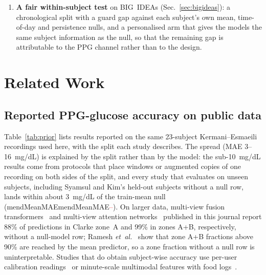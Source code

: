 \documentclass[journal]{IEEEtran}
\newcommand{\m}[1]{\ifcsname #1\endcsname\csname #1\endcsname\else\textcolor{red}{--}\fi}
\begin{document}
\begin{enumerate}
        pipeline for five re-implemented methods on VitalDB;
        \textsc{ppgbench} differs in asserting each protocol's no-leak
        guarantee in code, freezing folds, and adding subject-cluster
        intervals, controls, within-subject nulls and pretrained-encoder rows.
  \item \textbf{A fair within-subject test} on BIG~IDEAs
        (Sec.~\ref{sec:bigideas}): a chronological split with a guard gap
        against each subject's own mean, time-of-day and persistence nulls,
        and a personalised arm that gives the models the same subject
        information as the null, so that the remaining gap is attributable
        to the PPG channel rather than to the design.
\end{enumerate}

\section{Related Work}
\label{sec:related}

\subsection{Reported PPG-glucose accuracy on public data}
Table~\ref{tab:prior} lists results reported on the same 23-subject
Kermani--Esmaeili recordings used here, with the split each study describes.
The spread (MAE 3--16~mg/dL) is explained by the split rather than by the
model: the sub-10~mg/dL results come from protocols that place windows or
augmented copies of one recording on both sides of the split, and every
study that evaluates on unseen subjects, including Syamsul and Kim's
held-out subjects without a null row, lands within about 3~mg/dL of the
train-mean null (\m{mendMeanMAE}).  On larger data, multi-view fusion
transformers~\cite{chen2024mvcft} and multi-view attention
networks~\cite{ali2025jbhi} published in this journal report 88\% of
predictions in Clarke zone~A and 99\% in zones A+B, respectively, without a
null-model row; Ramesh \emph{et~al.}~\cite{ramesh2026} show that zone A+B
fractions above 90\% are reached by the mean predictor, so a zone fraction
without a null row is uninterpretable.  Studies that do obtain subject-wise accuracy use per-user
calibration readings~\cite{chu2021,chu2025} or minute-scale multimodal
features with food logs~\cite{bent2021}.
\end{document}
